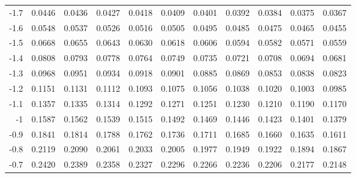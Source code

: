 \begin{center}
\begin{minipage}{5in}
\begin{center}
\begin{tabular}{|r|rrrrrrrrrr|}
\cellcolor{lightgray}	-1.7	&\cellcolor{lightgray}	0.0446	&\cellcolor{lightgray}	0.0436	&\cellcolor{lightgray}	0.0427	&\cellcolor{lightgray}	0.0418	&\cellcolor{lightgray}	0.0409	&\cellcolor{lightgray}	0.0401	&\cellcolor{lightgray}	0.0392	&\cellcolor{lightgray}	0.0384	&\cellcolor{lightgray}	0.0375	&\cellcolor{lightgray}	0.0367	\\
\cellcolor{lightgray}	-1.6	&\cellcolor{lightgray}	0.0548	&\cellcolor{lightgray}	0.0537	&\cellcolor{lightgray}	0.0526	&\cellcolor{lightgray}	0.0516	&\cellcolor{lightgray}	0.0505	&\cellcolor{lightgray}	0.0495	&\cellcolor{lightgray}	0.0485	&\cellcolor{lightgray}	0.0475	&\cellcolor{lightgray}	0.0465	&\cellcolor{lightgray}	0.0455	\\
\cellcolor{lightgray}	-1.5	&\cellcolor{lightgray}	0.0668	&\cellcolor{lightgray}	0.0655	&\cellcolor{lightgray}	0.0643	&\cellcolor{lightgray}	0.0630	&\cellcolor{lightgray}	0.0618	&\cellcolor{lightgray}	0.0606	&\cellcolor{lightgray}	0.0594	&\cellcolor{lightgray}	0.0582	&\cellcolor{lightgray}	0.0571	&\cellcolor{lightgray}	0.0559	\\
	-1.4	&	0.0808	&	0.0793	&	0.0778	&	0.0764	&	0.0749	&	0.0735	&	0.0721	&	0.0708	&	0.0694	&	0.0681	\\
	-1.3	&	0.0968	&	0.0951	&	0.0934	&	0.0918	&	0.0901	&	0.0885	&	0.0869	&	0.0853	&	0.0838	&	0.0823	\\
	-1.2	&	0.1151	&	0.1131	&	0.1112	&	0.1093	&	0.1075	&	0.1056	&	0.1038	&	0.1020	&	0.1003	&	0.0985	\\
	-1.1	&	0.1357	&	0.1335	&	0.1314	&	0.1292	&	0.1271	&	0.1251	&	0.1230	&	0.1210	&	0.1190	&	0.1170	\\
	-1	&	0.1587	&	0.1562	&	0.1539	&	0.1515	&	0.1492	&	0.1469	&	0.1446	&	0.1423	&	0.1401	&	0.1379	\\
\cellcolor{lightgray}	-0.9	&\cellcolor{lightgray}	0.1841	&\cellcolor{lightgray}	0.1814	&\cellcolor{lightgray}	0.1788	&\cellcolor{lightgray}	0.1762	&\cellcolor{lightgray}	0.1736	&\cellcolor{lightgray}	0.1711	&\cellcolor{lightgray}	0.1685	&\cellcolor{lightgray}	0.1660	&\cellcolor{lightgray}	0.1635	&\cellcolor{lightgray}	0.1611	\\
\cellcolor{lightgray}	-0.8	&\cellcolor{lightgray}	0.2119	&\cellcolor{lightgray}	0.2090	&\cellcolor{lightgray}	0.2061	&\cellcolor{lightgray}	0.2033	&\cellcolor{lightgray}	0.2005	&\cellcolor{lightgray}	0.1977	&\cellcolor{lightgray}	0.1949	&\cellcolor{lightgray}	0.1922	&\cellcolor{lightgray}	0.1894	&\cellcolor{lightgray}	0.1867	\\
\cellcolor{lightgray}	-0.7	&\cellcolor{lightgray}	0.2420	&\cellcolor{lightgray}	0.2389	&\cellcolor{lightgray}	0.2358	&\cellcolor{lightgray}	0.2327	&\cellcolor{lightgray}	0.2296	&\cellcolor{lightgray}	0.2266	&\cellcolor{lightgray}	0.2236	&\cellcolor{lightgray}	0.2206	&\cellcolor{lightgray}	0.2177	&\cellcolor{lightgray}	0.2148	\\

\end{tabular}
\end{center}
\end{minipage}
\end{center}
